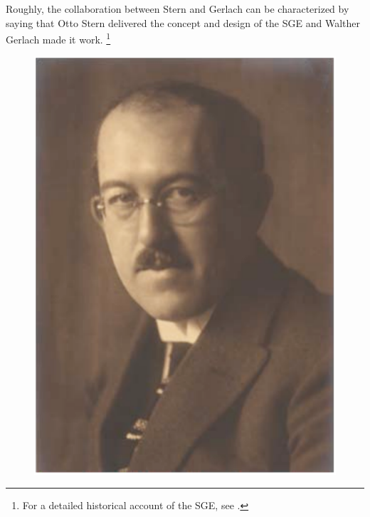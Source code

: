 \documentclass{article}
\begin{document}
Roughly, the collaboration between Stern and Gerlach can be characterized by saying that Otto Stern delivered the concept and design of the SGE and Walther Gerlach made it work.%
\footnote{For a detailed historical account of the SGE, see \citep{TrageserW2011Effekt}.}
%
\begin{figure}
\begin{center}
\includegraphics[scale=0.5]{figures/Stern1920}

\end{center}
\end{figure}
\end{document}
